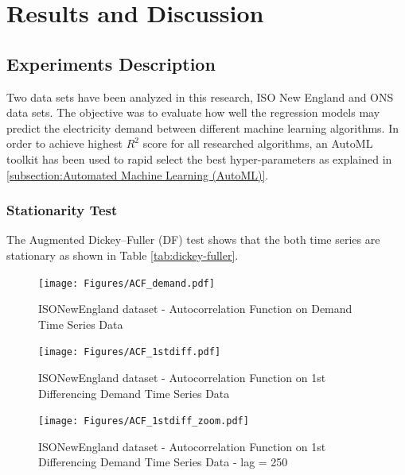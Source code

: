 
\chapter{Results and Discussion} %

\label{Chapter5} %


\section{Experiments Description} \label{section:Experiments Description}
Two data sets have been analyzed in this research, ISO New England and ONS data sets. The objective was to evaluate how well the regression models may predict the electricity demand between different machine learning algorithms. In order to achieve highest $R^2$ score for all researched algorithms, an AutoML toolkit has been used to rapid select the best hyper-parameters as explained in \ref{subsection:Automated Machine Learning (AutoML)}.

\subsection{Stationarity Test}
The Augmented Dickey–Fuller (DF) test \citep{dickey_distribution_1979} shows that the both time series are stationary as shown in Table \ref{tab:dickey-fuller}.


\begin{figure}[!htpb]
\centering
\texttt{[image: Figures/ACF\_demand.pdf]}
\caption{ISONewEngland dataset - Autocorrelation Function on Demand Time Series Data}
\label{fig:ISONE_ACF_demand}
\end{figure}

\begin{figure}[!htpb]
\centering
\texttt{[image: Figures/ACF\_1stdiff.pdf]}
\caption{ISONewEngland dataset - Autocorrelation Function on 1st Differencing Demand Time Series Data }
\label{fig:ISONE_ACF_demand_1stdiff}
\end{figure}

\begin{figure}[!htpb]
\centering
\texttt{[image: Figures/ACF\_1stdiff\_zoom.pdf]}
\caption{ISONewEngland dataset - Autocorrelation Function on 1st Differencing Demand Time Series Data - lag = 250 }
\label{fig:ISONE_ACF_demand_1stdiff}
\end{figure}




